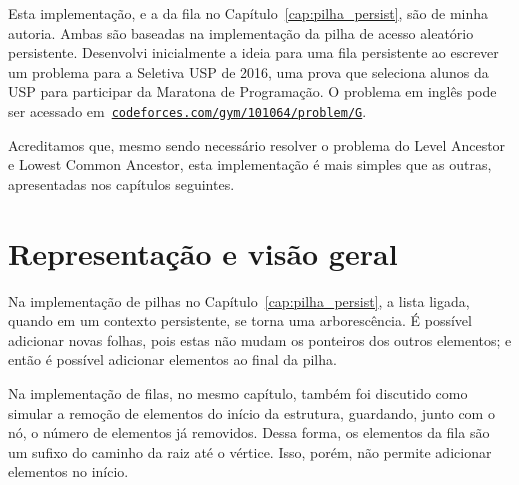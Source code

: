 \documentclass[main.tex]{subfiles}
\begin{document}
Esta implementação, e a da fila no Capítulo~\ref{cap:pilha_persist}, são de minha autoria. Ambas são baseadas na implementação da pilha de acesso aleatório persistente. Desenvolvi inicialmente a ideia para uma fila persistente ao escrever um problema para a Seletiva USP de 2016, uma prova que seleciona alunos da USP para participar da Maratona de Programação. O problema em inglês pode ser acessado em~\href{http://codeforces.com/gym/101064/problem/G}{\texttt{codeforces.com/gym/101064/problem/G}}.

Acreditamos que, mesmo sendo necessário resolver o problema do Level Ancestor e Lowest Common Ancestor, esta implementação é mais simples que as outras, apresentadas nos capítulos seguintes.

\section{Representação e visão geral}

Na implementação de pilhas no Capítulo~\ref{cap:pilha_persist}, a lista ligada, quando em um contexto persistente, se torna uma arborescência. É possível adicionar novas folhas, pois estas não mudam os ponteiros dos outros elementos; e então é possível adicionar elementos ao final da pilha.

Na implementação de filas, no mesmo capítulo, também foi discutido como simular a remoção de elementos do início da estrutura, guardando, junto com o nó, o número de elementos já removidos. Dessa forma, os elementos da fila são um sufixo do caminho da raiz até o vértice. Isso, porém, não permite adicionar elementos no início.
\end{document}
